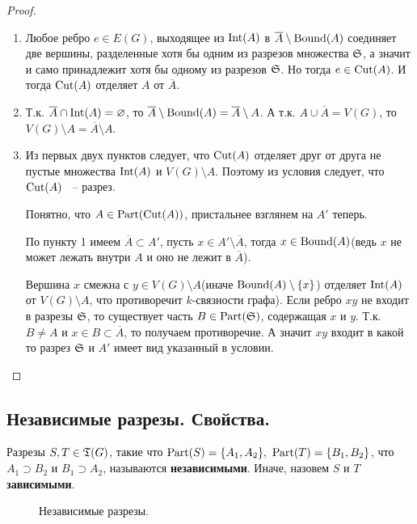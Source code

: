 \begin{proof}
	\begin{enumerate}
		\item Любое ребро  $e \in E(G)$, выходящее из  $\Int(A)$ в  $\overline A \setminus \Bound(A)$ соединяет две вершины, разделенные хотя бы одним из разрезов множества  $\S$, а значит и само принадлежит хотя бы одному из разрезов  $\S$. Но тогда  $e \in \Cut(A)$. И тогда $\Cut(A)$ отделяет  $A$ от  $\overline A$.

		\item Т.к.  $\overline A \cap \Int(A) = \varnothing$, то  $\overline A \setminus \Bound(A) = \overline A \setminus A$.
			А т.к.  $A \cup \overline A = V(G)$, то  $V(G) \setminus A = \overline A \setminus A$.
		\item Из первых двух пунктов следует, что $\Cut(A)$ отделяет друг от друга не пустые множества  $\Int(A)$ и  $V(G) \setminus A$. Поэтому из условия следует, что $\Cut(A)$ ~-- разрез.

			Понятно, что  $A \in \Part(\Cut(A))$, пристальнее взглянем на  $A'$ теперь.

			По пункту 1 имеем  $\overline A \subset A'$, пусть  $x \in A' \setminus \overline A$, тогда  $x \in \Bound(A)$(ведь $x$ не может лежать внутри  $A$ и оно не лежит в  $\overline A$).

			Вершина $x$ смежна с  $y \in V(G) \setminus A$(иначе $\Bound(A) \setminus\{x\}$) отделяет $\Int(A)$ от  $V(G) \setminus A$, что противоречит $k$-связности графа).
			Если ребро $xy$ не входит в разрезы  $\S$, то существует часть  $B \in \Part(\S)$, содержащая $x$ и $y$. Т.к. $B \neq A$ и  $x \in B \subset \overline A$, то получаем противоречие.
			А значит $xy$ входит в какой то разрез  $\S$ и  $A'$ имеет вид указанный в условии.
	\end{enumerate}
\end{proof}

\subsection{Независимые разрезы. Свойства.}

\begin{df*}
	Разрезы $S, T \in \T(G)$, такие что $\Part(S) = \{A_1, A_2\}, \ \Part(T) = \{B_1, B_2\}$, что $A_1 \supset B_2$ и $B_1 \supset A_2$, называются \textbf{независимыми}.
	Иначе, назовем $S$ и  $T$ \textbf{зависимыми}.
\end{df*}

\begin{figure}[ht]
    \centering
	\caption{Независимые разрезы.}
    \label{fig:df_0_independent_cuts}
\end{figure}

